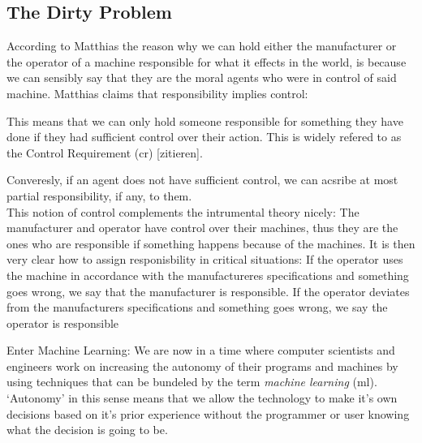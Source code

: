 \documentclass{article}
\begin{document}
\subsection{The Dirty Problem}

According to Matthias \cite{Matthias_2004} the reason why we can hold either the
manufacturer or the operator of a machine responsible for what it effects in the
world, is because we can sensibly say that they are the moral agents who were in
control of said machine. Matthias claims that responsibility implies control:

\vspace{.8em}
 \cite[p.175]{Matthias_2004}

\vspace{.8em}
This means that we can only hold someone responsible for something they have
done if they had sufficient control over their action.
This is widely refered to as the Control Requirement (\acrshort{cr}) [zitieren].

Converesly, if an agent does not have sufficient control, we can acsribe at most
partial responsibility, if any, to them.\\
This notion of control complements the intrumental theory nicely: The
manufacturer and operator have control over their machines, thus they are the
ones who are responsible if something happens because of the machines.
It is then very clear how to assign responisbility in critical situations: If the operator uses the
machine in accordance with the manufactureres specifications and something goes
wrong, we say that the manufacturer is responsible. If the operator deviates
from the manufacturers specifications and something goes wrong, we say the
operator is responsible\cite[p.175]{Matthias_2004}

Enter Machine Learning:
We are now in a time where computer scientists and engineers work on increasing
the autonomy of their programs and machines by using techniques that can be
bundeled by the term \textit{machine learning} (\acrshort{ml}). `Autonomy' in this sense
means that we allow the technology to make it's own decisions based on it's
prior experience without the programmer or user knowing what the decision is
going to be. 

\end{document}
